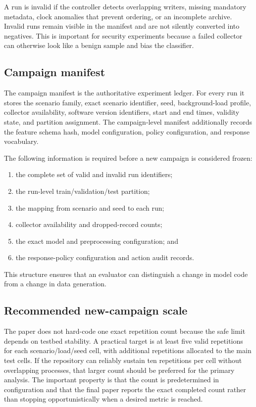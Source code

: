\documentclass[sigconf,review]{acmart}
\begin{document}
A run is invalid if the controller detects overlapping writers, missing mandatory metadata, clock anomalies that prevent ordering, or an incomplete archive. Invalid runs remain visible in the manifest and are not silently converted into negatives. This is important for security experiments because a failed collector can otherwise look like a benign sample and bias the classifier.

\subsection{Campaign manifest}
The campaign manifest is the authoritative experiment ledger. For every run it stores the scenario family, exact scenario identifier, seed, background-load profile, collector availability, software version identifiers, start and end times, validity state, and partition assignment. The campaign-level manifest additionally records the feature schema hash, model configuration, policy configuration, and response vocabulary.

The following information is required before a new campaign is considered frozen:
\begin{enumerate}[leftmargin=*]
\item the complete set of valid and invalid run identifiers;
\item the run-level train/validation/test partition;
\item the mapping from scenario and seed to each run;
\item collector availability and dropped-record counts;
\item the exact model and preprocessing configuration; and
\item the response-policy configuration and action audit records.
\end{enumerate}
This structure ensures that an evaluator can distinguish a change in model code from a change in data generation.

\subsection{Recommended new-campaign scale}
The paper does not hard-code one exact repetition count because the safe limit depends on testbed stability. A practical target is at least five valid repetitions for each scenario/load/seed cell, with additional repetitions allocated to the main test cells. If the repository can reliably sustain ten repetitions per cell without overlapping processes, that larger count should be preferred for the primary analysis. The important property is that the count is predetermined in configuration and that the final paper reports the exact completed count rather than stopping opportunistically when a desired metric is reached.
\end{document}
